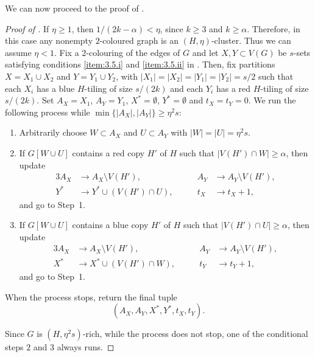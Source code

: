 \documentclass[a4paper,reqno,11pt]{amsart}
\theoremstyle{definition}
\theoremstyle{remark}
\renewcommand\ge{\geqslant}
\renewcommand\to{\rightarrow}
\begin{document}
We can now proceed to the proof of .

\begin{proof}[Proof of ] If $\eta \ge 1$, then $1/(2k-\alpha)<\eta$, since $k\ge 3$ and $k \ge \alpha$. Therefore, in this case any nonempty $2$-coloured graph is an $(H,\eta)$-cluster. Thus we can assume $\eta<1$. Fix a $2$-colouring of the edges of $G$ and let $X,Y \subset V(G)$ be $s$-sets satisfying conditions \ref{item:3.5.i} and \ref{item:3.5.ii} in . Then, fix partitions $X=X_1 \cup X_2$ and $Y=Y_1 \cup Y_2$, with $|X_1|=|X_2|=|Y_1|=|Y_2|=s/2$ such that each $X_i$ has a blue $H$-tiling of size $s/(2k)$ and each $Y_i$ has a red $H$-tiling of size $s/(2k)$. Set $A_X = X_1$, $A_Y = Y_1$, $X^{*} = \emptyset$, $Y^{*} = \emptyset$ and $t_X = t_Y= 0$. We run the following process while $\min\{|A_X|,|A_Y|\}\ge \eta^2 s$:
\begin{enumerate}[topsep=6pt, partopsep=6pt, itemsep=4pt, parsep=4pt, label=\arabic*.]
    \item Arbitrarily choose $W \subset A_X$ and $U \subset A_Y$ with 
    $|W| = |U| = \eta^2 s$.

    \item If $G[W \cup U]$ contains a red copy $H'$ of $H$ such that $|V(H') \cap W| \ge \alpha$, then update
    \begin{alignat*}{3}
        A_X &\to A_X \setminus V(H'), \qquad &A_Y &\to A_Y \setminus V(H'), \\
        Y^{*} &\to Y^{*} \cup (V(H') \cap U),\qquad &t_X &\to t_X + 1,
    \end{alignat*}
    and go to Step~1.

    \item If $G[W \cup U]$ contains a blue copy $H'$ of $H$ such that $|V(H') \cap U| \ge \alpha$, then update
    \begin{alignat*}{3}
        A_X &\to A_X \setminus V(H'), \qquad &A_Y &\to A_Y \setminus V(H'), \\
        X^{*} &\to X^{*} \cup (V(H') \cap W),\qquad &t_Y &\to t_Y + 1,
    \end{alignat*}
    and go to Step~1.
\end{enumerate}

When the process stops, return the final tuple
\[(A_X, A_Y, X^*, Y^*, t_X, t_Y).\]

Since $G$ is $(H,\eta^2s)$-rich, while the process does not stop, one of the conditional steps $2$ and $3$ always runs.


\end{proof}
\end{document}
